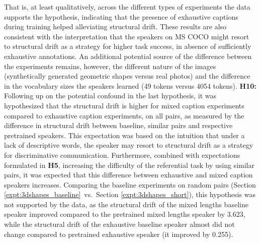 That is, at least qualitatively, across the different types of experiments the data supports the hypothesis, indicating that the presence of exhaustive captions during training helped alleviating structural drift. These results are also consistent with the interpretation that the speakers on MS COCO might resort to structural drift as a strategy for higher task success, in absence of sufficiently exhaustive annotations.
An additional potential source of the difference between the experiments remains, however, the different nature of the images (synthetically generated geometric shapes versus real photos) and the difference in the vocabulary sizes the speakers learned (49 tokens versus 4054 tokens). \newline
\textbf{H10:} Following up on the potential confound in the last hypothesis, it was hypothesized that the structural drift is higher for mixed caption experiments compared to exhaustive caption experiments, on all pairs, as measured by the difference in structural drift between baseline, similar pairs and respective pretrained speakers. This expectation was based on the intuition that under a lack of descriptive words, the speaker may resort to structural drift as a strategy for discriminative communication. Furthermore, combined with expectations formulated in \textbf{H5}, increasing the difficulty of the referential task by using similar pairs, it was expected that this difference between exhaustive and mixed caption speakers increases. 
Comparing the baseline experiments on random pairs (Section \ref{expt:3dshapes_baseline}~vs.~Section \ref{expt:3dshapes_short}), this hypothesis was not supported by the data, as the structural drift of the mixed lengths baseline speaker improved compared to the pretrained mixed lengths speaker by 3.623, while the structural drift of the exhaustive baseline speaker almost did not change compared to pretrained exhaustive speaker (it improved by 0.255). %
